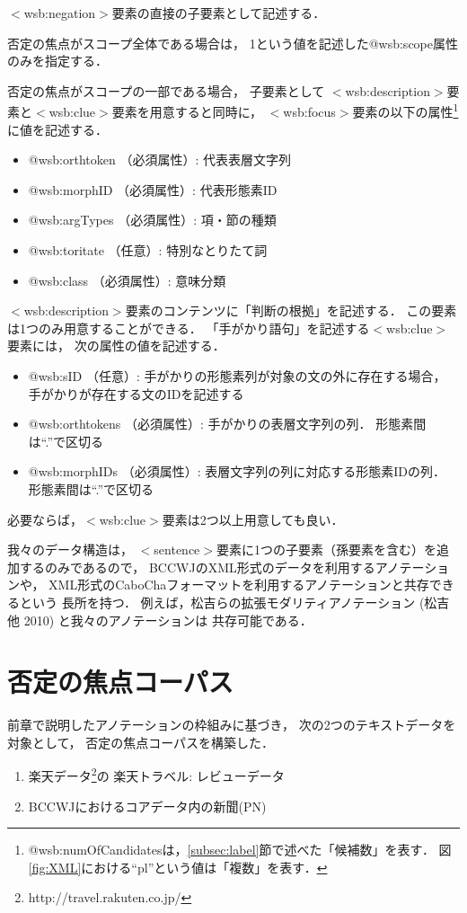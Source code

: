 \documentclass[japanese]{jnlp_1.4}
\begin{document}
$<$wsb:negation$>$要素の直接の子要素として記述する．

否定の焦点がスコープ全体である場合は，
1という値を記述した@wsb:scope属性のみを指定する．

否定の焦点がスコープの一部である場合，
子要素として
$<$wsb:description$>$要素と$<$wsb:clue$>$要素を用意すると同時に，
$<$wsb:focus$>$要素の以下の属性\footnote{
@wsb:numOfCandidatesは，\ref{subsec:label}節で述べた「候補数」を表す．
図\ref{fig:XML}における``pl''という値は「複数」を表す．
}に値を記述する．
\begin{itemize}
\item @wsb:orthtoken （必須属性）: 代表表層文字列
\item @wsb:morphID （必須属性）: 代表形態素ID
\item @wsb:argTypes （必須属性）: 項・節の種類
\item @wsb:toritate （任意）: 特別なとりたて詞
\item @wsb:class （必須属性）: 意味分類
\end{itemize}
$<$wsb:description$>$要素のコンテンツに「判断の根拠」を記述する．
この要素は1つのみ用意することができる．
「手がかり語句」を記述する$<$wsb:clue$>$要素には，
次の属性の値を記述する．
\begin{itemize}
\item @wsb:sID （任意）: 手がかりの形態素列が対象の文の外に存在する場合，
手がかりが存在する文のIDを記述する
\item @wsb:orthtokens （必須属性）: 手がかりの表層文字列の列．
  形態素間は``.''で区切る
\item @wsb:morphIDs （必須属性）: 表層文字列の列に対応する形態素IDの列．
  形態素間は``.''で区切る
\end{itemize}
必要ならば，$<$wsb:clue$>$要素は2つ以上用意しても良い．

我々のデータ構造は，
$<$sentence$>$要素に1つの子要素（孫要素を含む）を追加するのみであるので，
BCCWJのXML形式のデータを利用するアノテーションや，
XML形式のCaboChaフォーマットを利用するアノテーションと共存できるという
長所を持つ．
    例えば，松吉らの拡張モダリティアノテーション (松吉 他 2010)
と我々のアノテーションは
共存可能である．


\section{否定の焦点コーパス}
\label{sec:corpus}

前章で説明したアノテーションの枠組みに基づき，
次の2つのテキストデータを対象として，
否定の焦点コーパスを構築した．
\begin{enumerate}
\item 楽天データ\footnote{http://travel.rakuten.co.jp/}の
  楽天トラベル: レビューデータ
\item BCCWJにおけるコアデータ内の新聞(PN)
\end{enumerate}
\end{document}
